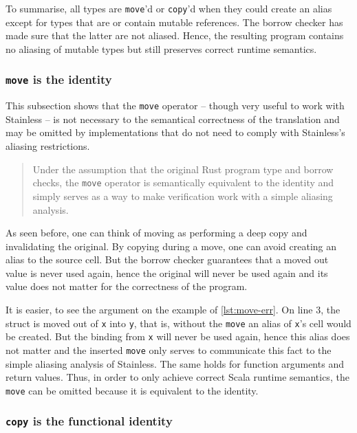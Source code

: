 To summarise, all types are \lstinline!move!'d or \lstinline!copy!'d when they
could create an alias except for types that are or contain mutable references.
The borrow checker has made sure that the latter are not aliased. Hence, the
resulting program contains no aliasing of mutable types but still preserves
correct runtime semantics.

\subsubsection{\texttt{move} is the identity}

This subsection shows that the \lstinline!move! operator -- though very useful
to work with Stainless -- is not necessary to the semantical correctness of the
translation and may be omitted by implementations that do not need to comply
with Stainless's aliasing restrictions.

\begin{quote}
Under the assumption that the original Rust program type and borrow checks, the
\lstinline!move! operator is semantically equivalent to the identity and simply
serves as a way to make verification work with a simple aliasing analysis.
\end{quote}

As seen before, one can think of moving as performing a deep copy and
invalidating the original. By copying during a move, one can avoid creating an
alias to the source cell. But the borrow checker guarantees that a moved out
value is never used again, hence the original will never be used again and its
value does not matter for the correctness of the program.

It is easier, to see the argument on the example of \autoref{lst:move-err}. On
line 3, the struct is moved out of \lstinline!x! into \lstinline!y!, that is,
without the \lstinline!move! an alias of \lstinline!x!'s cell would be created.
But the binding from \lstinline!x! will never be used again, hence this alias
does not matter and the inserted \lstinline!move! only serves to communicate
this fact to the simple aliasing analysis of Stainless. The same holds for
function arguments and return values. Thus, in order to only achieve correct
Scala runtime semantics, the \lstinline!move! can be omitted because it is
equivalent to the identity.

\subsubsection{\texorpdfstring{\texttt{copy} is the functional
identity}{copy is the functional identity}}

